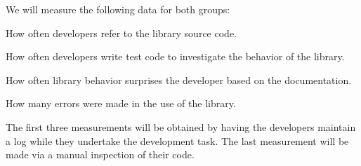 \documentclass[letterpaper,12pt]{article}
\let\Itemize =\itemize
\def\Nospacing{\itemsep=0pt\topsep=0pt\partopsep=0pt\parskip=0pt\parsep=0pt}
\renewenvironment{itemize}{\Itemize\Nospacing}{\endlist}
\begin{document}
We will measure the following data for both groups:

\begin{itemize}
\item How often developers refer to the library source code.
\item How often developers write test code to investigate the behavior of the
  library.
\item How often library behavior surprises the developer based on the
  documentation.
\item How many errors were made in the use of the library.
\end{itemize}

The first three measurements will be obtained by having the developers maintain
a log while they undertake the development task. The last measurement will be
made via a manual inspection of their code.
\end{document}

